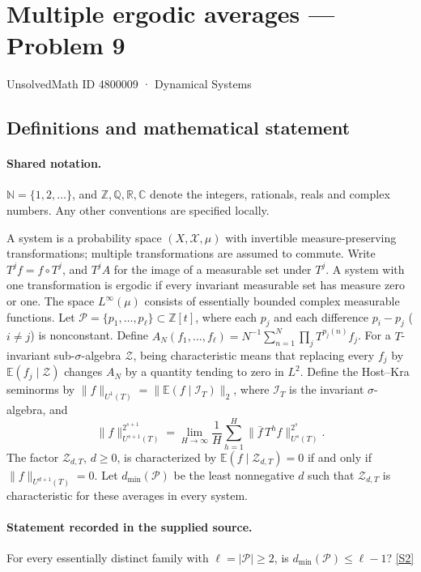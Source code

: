 \documentclass[11pt]{article}
\newcommand{\sref}[2]{\hyperlink{source:#1:#2}{[S#2]}}
\begin{document}
\setcounter{section}{4800008}
\section{Multiple ergodic averages — Problem 9}\label{4800009}
{\small\sffamily UnsolvedMath ID 4800009 · Dynamical Systems}
\subsection{Definitions and mathematical statement}

\paragraph{Shared notation.}$\mathbb N=\{1,2,\ldots\}$, and $\mathbb Z,\mathbb Q,\mathbb R,\mathbb C$ denote the integers, rationals, reals and complex numbers. Any other conventions are specified locally.


A system is a probability space $(X,\mathcal X,\mu)$ with invertible measure-preserving transformations; multiple transformations are assumed to commute. Write $T^j f=f\circ T^j$, and $T^j A$ for the image of a measurable set under $T^j$. A system with one transformation is ergodic if every invariant measurable set has measure zero or one. The space $L^\infty(\mu)$ consists of essentially bounded complex measurable functions. Let $\mathcal P=\{p_1,\ldots,p_\ell\}\subset\mathbb Z[t]$, where each $p_j$ and each difference $p_i-p_j$ ($i\ne j$) is nonconstant. Define $A_N(f_1,\ldots,f_\ell)=N^{-1}\sum_{n=1}^N\prod_jT^{p_j(n)}f_j$. For a $T$-invariant sub-$\sigma$-algebra $\mathcal Z$, being characteristic means that replacing every $f_j$ by $\mathbb E(f_j\mid\mathcal Z)$ changes $A_N$ by a quantity tending to zero in $L^2$. Define the Host--Kra seminorms by $\|f\|_{U^1(T)}=\|\mathbb E(f\mid\mathcal I_T)\|_2$, where $\mathcal I_T$ is the invariant $\sigma$-algebra, and \[\|f\|_{U^{s+1}(T)}^{2^{s+1}}=\lim_{H\to\infty}\frac1H\sum_{h=1}^H\|\bar f\,T^h f\|_{U^s(T)}^{2^s}.\] The factor $\mathcal Z_{d,T}$, $d\ge0$, is characterized by $\mathbb E(f\mid\mathcal Z_{d,T})=0$ if and only if $\|f\|_{U^{d+1}(T)}=0$. Let $d_{\min}(\mathcal P)$ be the least nonnegative $d$ such that $\mathcal Z_{d,T}$ is characteristic for these averages in every system.
\paragraph{Statement recorded in the supplied source.}
For every essentially distinct family with $\ell=|\mathcal P|\ge2$, is $d_{\min}(\mathcal P)\le\ell-1$? \sref{4800009}{2}
\end{document}
